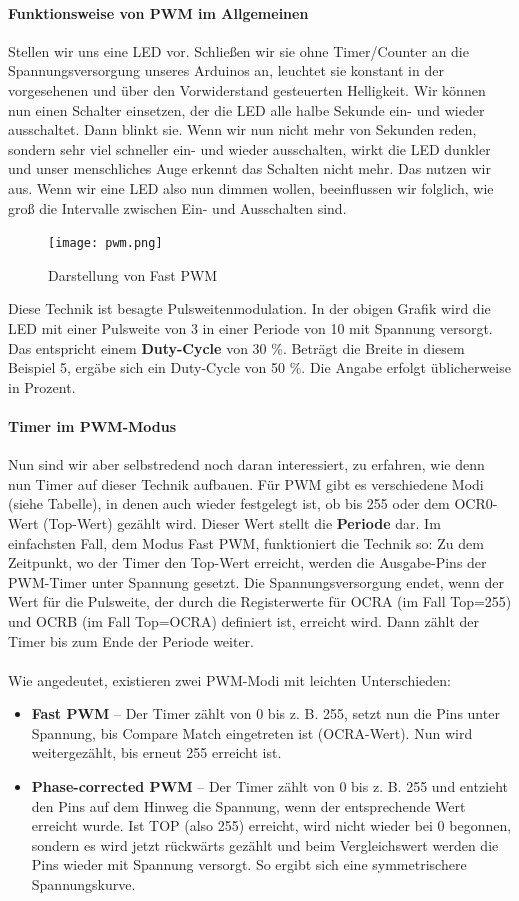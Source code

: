 \documentclass[11pt,a4paper]{scrartcl}
\begin{document}
\paragraph{Funktionsweise von PWM im Allgemeinen} Stellen wir uns eine LED vor. Schließen wir sie ohne Timer/Counter an die Spannungsversorgung unseres Arduinos an, leuchtet sie konstant in der vorgesehenen und über den Vorwiderstand gesteuerten Helligkeit. Wir können nun einen Schalter einsetzen, der die LED alle halbe Sekunde ein- und wieder ausschaltet. Dann blinkt sie. Wenn wir nun nicht mehr von Sekunden reden, sondern sehr viel schneller ein- und wieder ausschalten, wirkt die LED dunkler und unser menschliches Auge erkennt das Schalten nicht mehr. Das nutzen wir aus. Wenn wir eine LED also nun dimmen wollen, beeinflussen wir folglich, wie groß die Intervalle zwischen Ein- und Ausschalten sind.
\begin{figure}[h!]
\centering
\texttt{[image: pwm.png]}
\caption{Darstellung von Fast PWM}
\end{figure}
Diese Technik ist besagte Pulsweitenmodulation. In der obigen Grafik wird die LED mit einer Pulsweite von 3 in einer Periode von 10 mit Spannung versorgt. Das entspricht einem \textbf{Duty-Cycle} von 30 \%. Beträgt die Breite in diesem Beispiel 5, ergäbe sich ein Duty-Cycle von 50 \%. Die Angabe erfolgt üblicherweise in Prozent.
\paragraph{Timer im PWM-Modus} Nun sind wir aber selbstredend noch daran interessiert, zu erfahren, wie denn nun Timer auf dieser Technik aufbauen. Für PWM gibt es verschiedene Modi (siehe Tabelle), in denen auch wieder festgelegt ist, ob bis 255 oder dem OCR0-Wert (Top-Wert) gezählt wird. Dieser Wert stellt die \textbf{Periode} dar. Im einfachsten Fall, dem Modus Fast PWM, funktioniert die Technik so: Zu dem Zeitpunkt, wo der Timer den Top-Wert erreicht, werden die Ausgabe-Pins der PWM-Timer unter Spannung gesetzt. Die Spannungsversorgung endet, wenn der Wert für die Pulsweite, der durch die Registerwerte für OCRA (im Fall Top=255) und OCRB (im Fall Top=OCRA) definiert ist, erreicht wird. Dann zählt der Timer bis zum Ende der Periode weiter. \\\\
Wie angedeutet, existieren zwei PWM-Modi mit leichten Unterschieden:
\begin{itemize}
\item \textbf{Fast PWM} -- Der Timer zählt von 0 bis z. B. 255, setzt nun die Pins unter Spannung, bis Compare Match eingetreten ist (OCRA-Wert). Nun wird weitergezählt, bis erneut 255 erreicht ist.
\item \textbf{Phase-corrected PWM} -- Der Timer zählt von 0 bis z. B. 255 und entzieht den Pins auf dem {\glqq}Hinweg{\grqq} die Spannung, wenn der entsprechende Wert erreicht wurde. Ist TOP (also 255) erreicht, wird nicht wieder bei 0 begonnen, sondern es wird jetzt rückwärts gezählt und beim Vergleichswert werden die Pins wieder mit Spannung versorgt. So ergibt sich eine symmetrischere Spannungskurve. 
\end{itemize}
\end{document}
